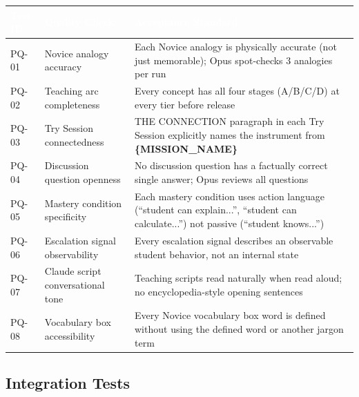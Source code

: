 \documentclass[11pt,letterpaper]{article}
\newcommand{\param}[1]{\textcolor{paramred}{\textbf{\{#1\}}}}
\newcommand{\tableheader}[1]{\textbf{\sffamily\textcolor{white}{#1}}}
\begin{document}
\begin{center}
\begin{tabularx}{\textwidth}{L{1.5cm}L{4cm}X}
\toprule
{}
\tableheader{Test ID} & \tableheader{Quality Check} & \tableheader{Acceptance Standard} \\
\midrule
PQ-01 & Novice analogy accuracy & Each Novice analogy is physically accurate (not just memorable); Opus spot-checks 3 analogies per run \\
PQ-02 & Teaching arc completeness & Every concept has all four stages (A/B/C/D) at every tier before release \\
PQ-03 & Try Session connectedness & THE CONNECTION paragraph in each Try Session explicitly names the instrument from \param{MISSION\_NAME} \\
PQ-04 & Discussion question openness & No discussion question has a factually correct single answer; Opus reviews all questions \\
PQ-05 & Mastery condition specificity & Each mastery condition uses action language (``student can explain...'', ``student can calculate...'') not passive (``student knows...'') \\
PQ-06 & Escalation signal observability & Every escalation signal describes an observable student behavior, not an internal state \\
PQ-07 & Claude script conversational tone & Teaching scripts read naturally when read aloud; no encyclopedia-style opening sentences \\
PQ-08 & Vocabulary box accessibility & Every Novice vocabulary box word is defined without using the defined word or another jargon term \\
\bottomrule
\end{tabularx}
\end{center}

\subsection{Integration Tests}
\end{document}
